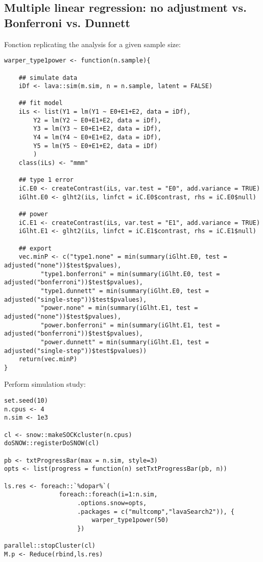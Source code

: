 \documentclass{article}
\begin{document}
\subsection{Multiple linear regression: no adjustment vs. Bonferroni vs. Dunnett}
\label{appendix:massUnivariate}
Fonction replicating the analysis for a given sample size:
\lstset{language=r,label= ,caption= ,captionpos=b,numbers=none}
\begin{lstlisting}
warper_type1power <- function(n.sample){

    ## simulate data
    iDf <- lava::sim(m.sim, n = n.sample, latent = FALSE)

    ## fit model
    iLs <- list(Y1 = lm(Y1 ~ E0+E1+E2, data = iDf),
		Y2 = lm(Y2 ~ E0+E1+E2, data = iDf),
		Y3 = lm(Y3 ~ E0+E1+E2, data = iDf),
		Y4 = lm(Y4 ~ E0+E1+E2, data = iDf),
		Y5 = lm(Y5 ~ E0+E1+E2, data = iDf)
		)
    class(iLs) <- "mmm"

    ## type 1 error
    iC.E0 <- createContrast(iLs, var.test = "E0", add.variance = TRUE)
    iGlht.E0 <- glht2(iLs, linfct = iC.E0$contrast, rhs = iC.E0$null)

    ## power
    iC.E1 <- createContrast(iLs, var.test = "E1", add.variance = TRUE)
    iGlht.E1 <- glht2(iLs, linfct = iC.E1$contrast, rhs = iC.E1$null)

    ## export
    vec.minP <- c("type1.none" = min(summary(iGlht.E0, test = adjusted("none"))$test$pvalues),
		  "type1.bonferroni" = min(summary(iGlht.E0, test = adjusted("bonferroni"))$test$pvalues),
		  "type1.dunnett" = min(summary(iGlht.E0, test = adjusted("single-step"))$test$pvalues),
		  "power.none" = min(summary(iGlht.E1, test = adjusted("none"))$test$pvalues),
		  "power.bonferroni" = min(summary(iGlht.E1, test = adjusted("bonferroni"))$test$pvalues),
		  "power.dunnett" = min(summary(iGlht.E1, test = adjusted("single-step"))$test$pvalues))
    return(vec.minP)
}
\end{lstlisting}

Perform simulation study:
\lstset{language=r,label= ,caption= ,captionpos=b,numbers=none}
\begin{lstlisting}
set.seed(10)
n.cpus <- 4
n.sim <- 1e3

cl <- snow::makeSOCKcluster(n.cpus)
doSNOW::registerDoSNOW(cl)

pb <- txtProgressBar(max = n.sim, style=3)
opts <- list(progress = function(n) setTxtProgressBar(pb, n))

ls.res <- foreach::`%dopar%`(
		       foreach::foreach(i=1:n.sim,
					.options.snow=opts,
					.packages = c("multcomp","lavaSearch2")), {
					    warper_type1power(50)
					})

parallel::stopCluster(cl)
M.p <- Reduce(rbind,ls.res)
\end{lstlisting}
\end{document}
